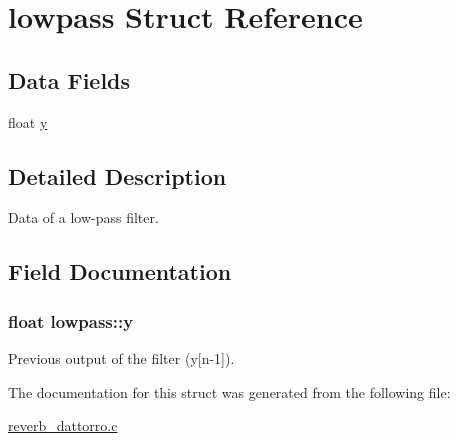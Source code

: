 \hypertarget{structlowpass}{\section{lowpass Struct Reference}
\label{structlowpass}
}
\subsection*{Data Fields}
\begin{DoxyCompactItemize}
\item 
float \hyperlink{structlowpass_a3045b839fbd6e8f04f40a6bac79f8faa}{y}
\end{DoxyCompactItemize}


\subsection{Detailed Description}
Data of a low-\/pass filter. 

\subsection{Field Documentation}
\hypertarget{structlowpass_a3045b839fbd6e8f04f40a6bac79f8faa}{
\subsubsection[{y}]{\setlength{\rightskip}{0pt plus 5cm}float lowpass\-::y}}\label{structlowpass_a3045b839fbd6e8f04f40a6bac79f8faa}
Previous output of the filter (y\mbox{[}n-\/1\mbox{]}). 

The documentation for this struct was generated from the following file\-:\begin{DoxyCompactItemize}
\item 
\hyperlink{reverb__dattorro_8c}{reverb\-\_\-dattorro.\-c}\end{DoxyCompactItemize}
